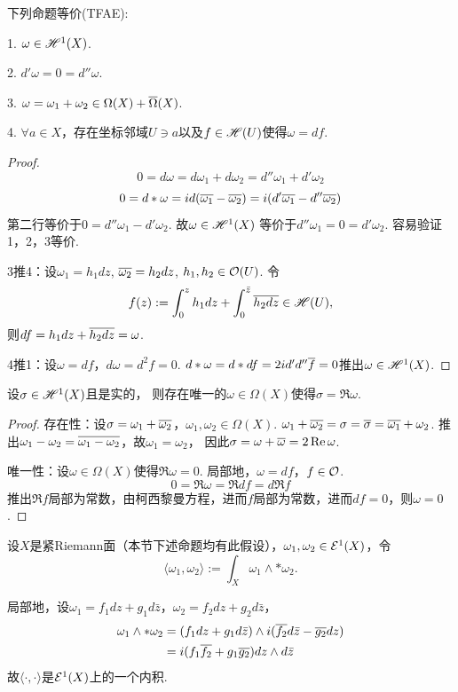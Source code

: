 \begin{theorem} 下列命题等价(TFAE):

	1. $\omega\in \mathscr{H}^1(X)$.\par
	2. $d'\omega=0=d''\omega$.\par
	3. $\omega=\omega_1+\omega_2\in \Omega(X)+\overline{\Omega}(X)$.\par
	4. $\forall a\in X$，存在坐标邻域$U\ni a$以及$f\in \mathscr{H}(U)$使得$\omega=df$.
\end{theorem}
		
\begin{proof}
	$$0=d\omega=d\omega_1+d\omega_2=d''\omega_1+d'\omega_2$$
	$$0=d*\omega=id(\overline{\omega_1}-\overline{\omega_2})
    =i(d'\overline{\omega_1}-d''\overline{\omega_2})$$
	第二行等价于$0=d''\omega_1-d'\omega_2$. 故$\omega\in \mathscr{H}^1(X)$
    等价于$d''\omega_1=0=d'\omega_2$. 容易验证1，2，3等价.

	3推4：设$\omega_1=h_1dz$, $\overline{\omega_2}=h_2dz$, $h_1,h_2\in \mathcal{O}(U)$. 令
	$$f(z):=\int_0^z h_1dz+ \int_0^{\bar{z}} \overline{h_2dz}\in \mathscr{H}(U),$$
	则$df=h_1dz+\overline{h_2dz}=\omega$.

	4推1：设$\omega=df$，$d\omega=d^2f=0$. 
    $d*\omega=d*df=2id'd''\overline{f}=0$推出$\omega\in \mathscr{H}^1(X)$.	
\end{proof}
		
\begin{theorem}
	设$\sigma\in \mathscr{H}^1(X)$且是实的，
    则存在唯一的$\omega\in \Omega(X)$使得$\sigma=\Re\omega$.
\end{theorem}

\begin{proof}
	存在性：设$\sigma=\omega_1+\overline{\omega_2}$，$\omega_1, \omega_2\in \Omega(X)$. 
    $\omega_1+\overline{\omega_2}=\sigma=\overline{\sigma}=\overline{\omega_1}+\omega_2$. 
    推出$\omega_1-\omega_2=\overline{\omega_1-\omega_2}$，故$\omega_1=\omega_2$，
    因此$\sigma=\omega+\overline{\omega}=2\operatorname{Re}\omega$.

	唯一性：设$\omega\in \Omega(X)$使得$\Re\omega=0$. 
    局部地，$\omega=df$，$f\in \mathcal{O}$.
	$$0=\Re\omega=\Re df=d \Re f$$
	推出$\Re f$局部为常数，由柯西黎曼方程，进而$f$局部为常数，进而$df=0$，则$\omega=0$.
\end{proof}

\begin{definition}
    设$X$是紧Riemann面（本节下述命题均有此假设），$\omega_1,\omega_2\in \mathcal{E}^1(X)$，令
    \[\langle \omega_1,\omega_2\rangle :=\int_X \omega_1\wedge *\omega_2.\]
\end{definition}

局部地，设$\omega_1=f_1dz+g_1d\bar{z}$，$\omega_2=f_2dz+g_2d\bar{z}$，
\begin{align*}
	\omega_1\wedge *\omega_2&=(f_1dz+g_1d\bar{z})\wedge i(\overline{f_2}d\bar{z}-\overline{g_2}dz)\\
	&=i(f_1\overline{f_2}+g_1\overline{g_2})dz\wedge d\bar{z}
\end{align*}
故$\langle \cdot, \cdot \rangle$是$\mathcal{E}^1(X)$上的一个内积.

